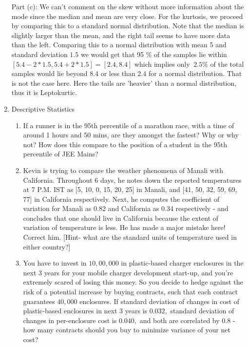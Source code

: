 \documentclass[12pt, oneside]{article}
\begin{document}
\begin{enumerate}
\newline Part (c): We can't comment on the skew without more information about the mode since the median and mean are very close. 
\newline For the kurtosis, we proceed by comparing this to a standard normal distribution. Note that the median is slightly larger than the mean, and the right tail seems to have more data than the left. Comparing this to a normal distribution with mean 5 and standard deviation $1.5$ we would get that 95 \% of the samples lie within $[5.4-2*1.5,5.4+2*1.5] = [2.4,8.4]$ which implies only $~2.5 \%$ of the total samples would lie beyond 8.4 or less than 2.4 for a normal distribution. That is not the case here. Here the tails are 'heavier' than a normal distribution, thus it is Leptokurtic. 

\item	Descriptive Statistics
\begin{enumerate}
    \item If a runner is in the 95th percentile of a marathon race, with a time of around 1 hours and 50 mins, are they amongst the fastest? Why or why not? How does this compare to the position of a student in the 95th percentile of JEE Mains? 
    \item Kevin is trying to compare the weather phenomena of Manali with California. Throughout 6 days, he notes down the reported temperatures at 7 P.M. IST as [5, 10, 0, 15, 20, 25] in Manali, and [41, 50, 32, 59, 69, 77] in California respectively. Next, he computes the coefficient of variation for Manali as 0.82 and California as 0.34 respectively - and concludes that one should live in California because the extent of variation of temperature is less. He has made a major mistake here! Correct him. [Hint- what are the standard units of temperature used in either country?]
    \item You have to invest in $10,00,000$ in plastic-based charger enclosures in the next $3$ years for your mobile charger development start-up, and you're extremely scared of losing this money. So you decide to hedge against the risk of a potential increase by buying contracts, such that each contract guarantees $40,000$ enclosures. If standard deviation of changes in cost of plastic-based enclosures in next $3$ years is $0.032,$ standard deviation of changes in per-enclosure cost is $0.040,$ and both are correlated by $0.8$ - how many contracts should you buy to minimize variance of your net cost?   

\end{enumerate}
\end{enumerate}
\end{document}
